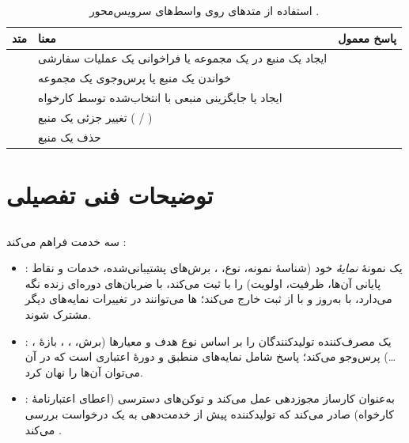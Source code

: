 \documentclass[11pt,a4paper]{article}
\begin{document}
\begin{table}[htbp]
\centering\small
\caption{استفاده از متدهای  روی واسط‌های سرویس‌محور \cite{ts29501}.}\label{tab:http}
\begin{tabularx}{\linewidth}{@{}l Y l@{}}
\toprule
{}متد & معنا & پاسخ معمول \\
\midrule
{}   & ایجاد یک منبع در یک مجموعه یا فراخوانی یک عملیات سفارشی &  \\
    & خواندن یک منبع یا پرس‌وجوی یک مجموعه                   &  \\
    & ایجاد یا جایگزینی منبعی با  انتخاب‌شده توسط کارخواه &  \\
  & تغییر جزئی یک منبع ( / )  &  \\
 & حذف یک منبع                                           &  \\
\bottomrule
\end{tabularx}
\end{table}

\section{توضیحات فنی تفصیلی}

\subsection{}
 سه خدمت فراهم می‌کند \cite{ts29510}:
\begin{itemize}
  \item \textbf{}: یک نمونهٔ  \emph{نمایهٔ } خود (شناسهٔ نمونه، نوع، ، برش‌های
        پشتیبانی‌شده، خدمات و نقاط پایانی آن‌ها، ظرفیت، اولویت) را با  ثبت می‌کند، با ضربان‌های دوره‌ای زنده نگه
        می‌دارد، با  به‌روز و با  از ثبت خارج می‌کند؛ ها می‌توانند در تغییرات نمایه‌های دیگر مشترک
        شوند.
  \item \textbf{}: یک مصرف‌کننده تولیدکنندگان را بر اساس نوع  هدف و معیارها (برش، ،
        ، بازهٔ ، \ldots) پرس‌وجو می‌کند؛ پاسخ شامل نمایه‌های منطبق و دورهٔ اعتباری است که در آن می‌توان آن‌ها
        را نهان کرد.
  \item \textbf{}:  به‌عنوان کارساز مجوزدهی  عمل می‌کند و توکن‌های دسترسی (اعطای
        اعتبارنامهٔ کارخواه) صادر می‌کند که تولیدکننده پیش از خدمت‌دهی به یک درخواست بررسی می‌کند \cite{rfc6749}.
\end{itemize}
\end{document}
